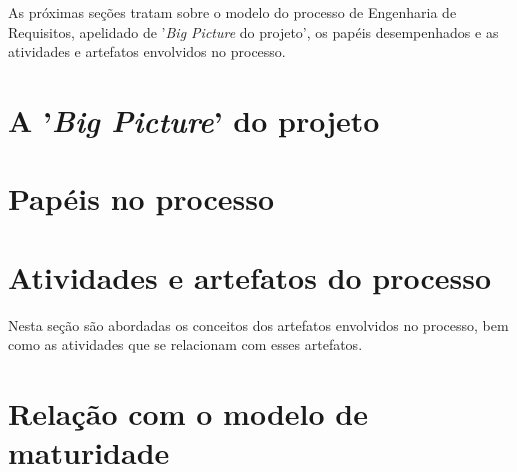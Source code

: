   As próximas seções tratam sobre o modelo do processo de Engenharia de Requisitos, apelidado de '\textit{Big Picture}
  do projeto', os papéis desempenhados e as atividades e artefatos envolvidos no processo.
  
  \pagebreak
  \section{A '\textit{Big Picture}' do projeto}

      
    
  \pagebreak
  \section{Papéis no processo}
    
    
    
  \pagebreak
  \section{Atividades e artefatos do processo}
    
    Nesta seção são abordadas os conceitos dos artefatos envolvidos no processo, bem como as atividades que se relacionam com
    esses artefatos.
    
    
  
  \pagebreak
  \section{Relação com o modelo de maturidade}
  
    
      
      

  